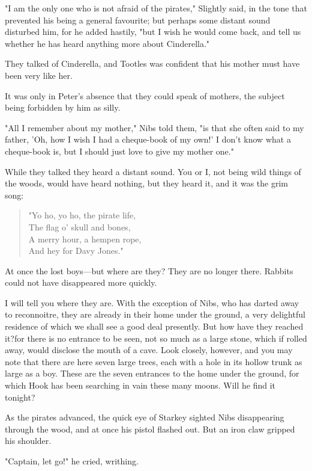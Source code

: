 "I am the only one who is not afraid of the pirates," Slightly said, in the tone that prevented his being a general favourite;
but perhaps some distant sound disturbed him, for he added hastily, "but I wish he would come back, and tell us whether he has heard anything more about Cinderella."

They talked of Cinderella, and Tootles was confident that his mother must have been very like her.

It was only in Peter's absence that they could speak of mothers, the subject being forbidden by him as silly.

"All I remember about my mother," Nibs told them, "is that she often said to my father, 'Oh, how I wish I had a cheque-book of my own!'
I don't know what a cheque-book is, but I should just love to give my mother one."

While they talked they heard a distant sound.
You or I, not being wild things of the woods, would have heard nothing, but they heard it, and it was the grim song:

\begin{verse}
	"Yo ho, yo ho, the pirate life,\\
	The flag o' skull and bones,\\
	A merry hour, a hempen rope,\\
	And hey for Davy Jones."
\end{verse}

At once the lost boys—but where are they?
They are no longer there.
Rabbits could not have disappeared more quickly.

I will tell you where they are.
With the exception of Nibs, who has darted away to reconnoitre, they are already in their home under the ground, a very delightful residence of which we shall see a good deal presently.
But how have they reached it?\@ for there is no entrance to be seen, not so much as a large stone, which if rolled away, would disclose the mouth of a cave.
Look closely, however, and you may note that there are here seven large trees, each with a hole in its hollow trunk as large as a boy.
These are the seven entrances to the home under the ground, for which Hook has been searching in vain these many moons.
Will he find it tonight?

As the pirates advanced, the quick eye of Starkey sighted Nibs disappearing through the wood, and at once his pistol flashed out.
But an iron claw gripped his shoulder.

"Captain, let go!\@" he cried, writhing.

